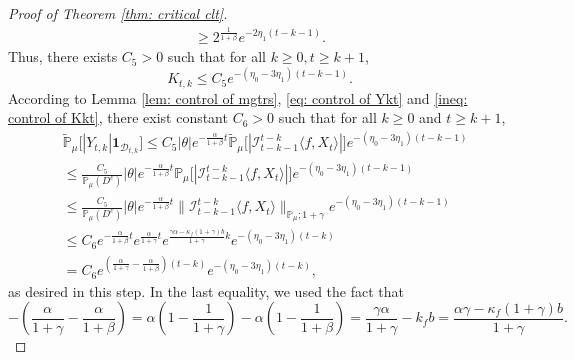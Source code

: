 \documentclass[12pt,a4paper]{amsart}
\theoremstyle{plain}
\theoremstyle{definition}
\numberwithin{equation}{section}
\begin{document}
\begin{proof}[Proof of Theorem \ref{thm: critical clt}]
\begin{align}
    \geq 2^{\frac{1}{1+\beta}} e^{-2\eta_1(t-k-1)}.
\end{align}
    Thus, there exists  $C_5> 0$ such that for all $k \geq 0, t\geq k+1$,
\begin{equation}
\label{ineq: control of Kkt}
     K_{t,k}
     \leq C_5 e^{-(\eta_0 - 3\eta_1)(t-k-1)}.
\end{equation}
    According to Lemma \ref{lem: control of mgtrs}, \eqref{eq: control of Ykt} and \eqref{ineq: control of Kkt},
    there exist constant $C_6>0$ such that for all $k\geq 0$ and $t\geq k+1$,
\begin{align}
\label{eq: Y in D}
    &\mathbb{\widetilde{P}}_{\mu}\big[|Y_{t,k}|\mathbf{1}_{\mathcal{D}_{t,k}}\big]
    \leq C_5|\theta|e^{-\frac{\alpha}{1+\beta}t}\mathbb{\widetilde{P}}_{\mu}\big[|\mathcal{I}_{t-k-1}^{t-k}\langle f,X_t\rangle|\big]e^{-(\eta_0 - 3\eta_1)(t-k-1)}
    \\&\leq \frac{C_5}{\mathbb{P}_{\mu}(D^c)}|\theta|e^{-\frac{\alpha}{1+\beta}t}\mathbb{P}_{\mu}\big[|\mathcal{I}_{t-k-1}^{t-k}\langle f,X_t\rangle|\big]e^{-(\eta_0 - 3\eta_1)(t-k-1)}
    \\&\leq \frac{C_5}{\mathbb{P}_{\mu}(D^c)}|\theta|e^{-\frac{\alpha}{1+\beta}t}\|\mathcal{I}_{t-k-1}^{t-k}\langle f,X_t\rangle\|_{\mathbb P_\mu; 1+\gamma} e^{-(\eta_0 - 3\eta_1)(t-k - 1)}
    \\&\leq C_6 e^{-\frac{\alpha}{1+\beta}t}e^{\frac{\alpha}{1+\gamma}t}e^{\frac{\gamma \alpha-\kappa_f(1+\gamma)b}{1+\gamma}k}e^{-(\eta_0 - 3\eta_1)(t-k)}
    \\&= C_6 e^{(\frac{\alpha}{1+\gamma}-\frac{\alpha}{1+\beta})(t-k)}e^{-(\eta_0 - 3\eta_1)(t-k)},
\end{align}
    as desired in this step.
    In the last equality, we used the fact that
\[
    -(\frac{\alpha}{1+\gamma}-\frac{\alpha}{1+\beta})
    = \alpha(1-\frac{1}{1+\gamma}) - \alpha(1-\frac{1}{1+\beta})
    = \frac{\gamma \alpha}{1+\gamma} - k_f b
    =\frac{\alpha \gamma-\kappa_f(1+\gamma)b}{1+\gamma}.
\]


\end{proof}
\end{document}
